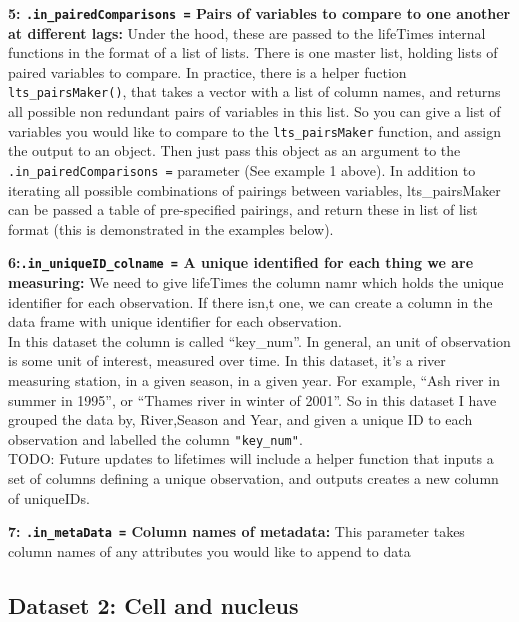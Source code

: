 \documentclass[
]{article}
\begin{document}
\textbf{5: \texttt{.in\_pairedComparisons\ =} Pairs of variables to
compare to one another at different lags:} Under the hood, these are
passed to the lifeTimes internal functions in the format of a list of
lists. There is one master list, holding lists of paired variables to
compare. In practice, there is a helper fuction
\texttt{lts\_pairsMaker()}, that takes a vector with a list of column
names, and returns all possible non redundant pairs of variables in this
list. So you can give a list of variables you would like to compare to
the \texttt{lts\_pairsMaker} function, and assign the output to an
object. Then just pass this object as an argument to the
\texttt{.in\_pairedComparisons\ =} parameter (See example 1 above). In
addition to iterating all possible combinations of pairings between
variables, lts\_pairsMaker can be passed a table of pre-specified
pairings, and return these in list of list format (this is demonstrated
in the examples below).

\textbf{6:\texttt{.in\_uniqueID\_colname\ =} A unique identified for
each thing we are measuring:} We need to give lifeTimes the column namr
which holds the unique identifier for each observation. If there isn,t
one, we can create a column in the data frame with unique identifier for
each observation.\\

In this dataset the column is called ``key\_num''. In general, an unit
of observation is some unit of interest, measured over time. In this
dataset, it's a river measuring station, in a given season, in a given
year. For example, ``Ash river in summer in 1995'', or ``Thames river in
winter of 2001''. So in this dataset I have grouped the data by,
River,Season and Year, and given a unique ID to each observation and
labelled the column \texttt{"key\_num"}.\\

TODO: Future updates to lifetimes will include a helper function that
inputs a set of columns defining a unique observation, and outputs
creates a new column of uniqueIDs.

\textbf{7: \texttt{.in\_metaData\ =} Column names of metadata:} This
parameter takes column names of any attributes you would like to append
to data

\hypertarget{dataset-2-cell-and-nucleus}{%
\subsection{\texorpdfstring{\textbf{Dataset 2: Cell and
nucleus}}{Dataset 2: Cell and nucleus}}\label{dataset-2-cell-and-nucleus}}
\end{document}
